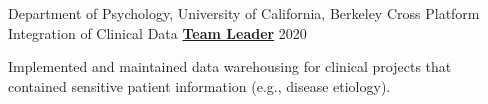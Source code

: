 \begin{cventries}
    
  \cventry 
    {Department of Psychology, University of California, Berkeley} %
    {Cross Platform Integration of Clinical Data}
    {\href{http://www.actcompthink.org/pubs/McDougleTsayEtAl_2021.pdf}{\textbf{Team Leader}}} %
    {2020} %
    {
      \begin{cvitems} %
      	\item {Implemented and maintained data warehousing for clinical projects that contained sensitive patient information (e.g., disease etiology).}
      \end{cvitems}
    } 

    
\end{cventries}
